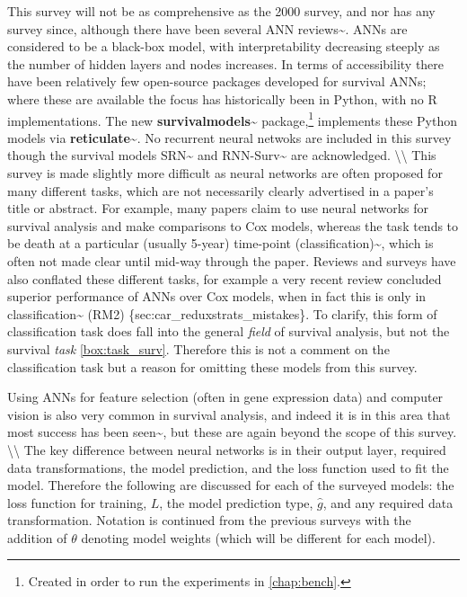 \documentclass[
  letterpaper,
]{scrbook}
\theoremstyle{plain}
\theoremstyle{definition}
\theoremstyle{remark}
\begin{document}
This survey will not be as comprehensive as the 2000 survey, and nor has
any survey since, although there have been several ANN
reviews\textasciitilde{}\cite{Ripley2001, Huang2020a, Ohno-Machado1996, Yang2010, Zhu2020}.
ANNs are considered to be a black-box model, with interpretability
decreasing steeply as the number of hidden layers and nodes increases.
In terms of accessibility there have been relatively few open-source
packages developed for survival ANNs; where these are available the
focus has historically been in Python, with no
\textsf{R} implementations. The new
\textbf{survivalmodels}\textasciitilde{}\cite{pkgsurvivalmodels}
package,\footnote{Created in order to run the experiments in \ref{chap:bench}.}
implements these Python models via
\textbf{reticulate}\textasciitilde{}\cite{pkgreticulate}. No recurrent
neural netwoks are included in this survey though the survival models
SRN\textasciitilde{}\cite{Oh2018} and
RNN-Surv\textasciitilde{}\cite{Giunchiglia2018} are acknowledged.
\textbackslash\textbackslash{} This survey is made slightly more
difficult as neural networks are often proposed for many different
tasks, which are not necessarily clearly advertised in a paper's title
or abstract. For example, many papers claim to use neural networks for
survival analysis and make comparisons to Cox models, whereas the task
tends to be death at a particular (usually 5-year) time-point
(classification)\textasciitilde{}\cite{Han2018, Lundin1999, Ripley2001, Ripley1998, Seker2002},
which is often not made clear until mid-way through the paper. Reviews
and surveys have also conflated these different tasks, for example a
very recent review concluded superior performance of ANNs over Cox
models, when in fact this is only in
classification\textasciitilde{}\cite{Huang2020} (RM2)
\{sec:car\_reduxstrats\_mistakes\}. To clarify, this form of
classification task does fall into the general \emph{field} of survival
analysis, but not the survival \emph{task} \ref{box:task_surv}.
Therefore this is not a comment on the classification task but a reason
for omitting these models from this survey.

Using ANNs for feature selection (often in gene expression data) and
computer vision is also very common in survival analysis, and indeed it
is in this area that most success has been
seen\textasciitilde{}\cite{Bello2019, Chen2014, Cui2020, Lao2017, McKinney2020, Rietschel2018, Seker2002a, Zhang2020, Zhu2016},
but these are again beyond the scope of this survey.
\textbackslash\textbackslash{} The key difference between neural
networks is in their output layer, required data transformations, the
model prediction, and the loss function used to fit the model. Therefore
the following are discussed for each of the surveyed models: the loss
function for training, \(L\), the model prediction type, \(\hat{g}\),
and any required data transformation. Notation is continued from the
previous surveys with the addition of \(\theta\) denoting model weights
(which will be different for each model).
\end{document}
